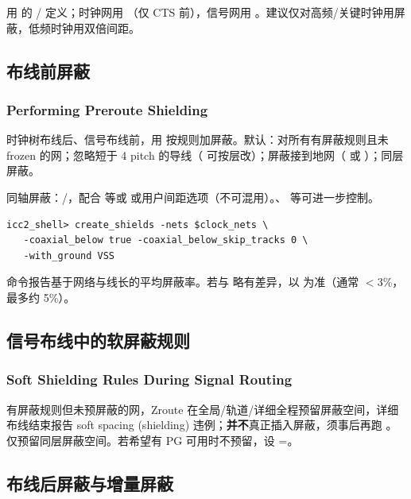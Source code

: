 用  的 / 定义；时钟网用 （仅 CTS 前），信号网用 。建议仅对高频/关键时钟用屏蔽，低频时钟用双倍间距。

\subsection{布线前屏蔽}
\subsubsection*{Performing Preroute Shielding}

时钟树布线后、信号布线前，用  按规则加屏蔽。默认：对所有有屏蔽规则且未 frozen 的网；忽略短于 4 pitch 的导线（ 可按层改）；屏蔽接到地网（ 或 ）；同层屏蔽。

同轴屏蔽：/，配合  等或  或用户间距选项（不可混用）。、 等可进一步控制。

\begin{lstlisting}
icc2_shell> create_shields -nets $clock_nets \
   -coaxial_below true -coaxial_below_skip_tracks 0 \
   -with_ground VSS
\end{lstlisting}

命令报告基于网络与线长的平均屏蔽率。若与  略有差异，以  为准（通常 $<$3\%，最多约 5\%）。

\subsection{信号布线中的软屏蔽规则}
\subsubsection*{Soft Shielding Rules During Signal Routing}

有屏蔽规则但未预屏蔽的网，Zroute 在全局/轨道/详细全程预留屏蔽空间，详细布线结束报告 soft spacing (shielding) 违例；\textbf{并不}真正插入屏蔽，须事后再跑 。仅预留同层屏蔽空间。若希望有 PG 可用时不预留，设 =。

\subsection{布线后屏蔽与增量屏蔽}
